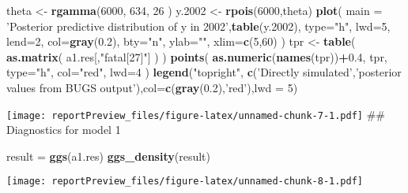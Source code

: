\documentclass[]{article}
\newenvironment{Shaded}{\begin{snugshade}}{\end{snugshade}}
\newcommand{\KeywordTok}[1]{\textcolor[rgb]{0.13,0.29,0.53}{\textbf{#1}}}
\newcommand{\DataTypeTok}[1]{\textcolor[rgb]{0.13,0.29,0.53}{#1}}
\newcommand{\DecValTok}[1]{\textcolor[rgb]{0.00,0.00,0.81}{#1}}
\newcommand{\FloatTok}[1]{\textcolor[rgb]{0.00,0.00,0.81}{#1}}
\newcommand{\StringTok}[1]{\textcolor[rgb]{0.31,0.60,0.02}{#1}}
\newcommand{\OperatorTok}[1]{\textcolor[rgb]{0.81,0.36,0.00}{\textbf{#1}}}
\newcommand{\NormalTok}[1]{#1}
\begin{document}
\begin{Shaded}
\begin{Highlighting}[]
\NormalTok{theta <-}\StringTok{ }\KeywordTok{rgamma}\NormalTok{(}\DecValTok{6000}\NormalTok{, }\DecValTok{634}\NormalTok{, }\DecValTok{26}\NormalTok{ )}
\NormalTok{y.}\DecValTok{2002}\NormalTok{ <-}\StringTok{ }\KeywordTok{rpois}\NormalTok{(}\DecValTok{6000}\NormalTok{,theta)}
\KeywordTok{plot}\NormalTok{( }\DataTypeTok{main =} \StringTok{'Posterior predictive distribution of y in 2002'}\NormalTok{,}\KeywordTok{table}\NormalTok{(y.}\DecValTok{2002}\NormalTok{), }\DataTypeTok{type=}\StringTok{"h"}\NormalTok{, }\DataTypeTok{lwd=}\DecValTok{5}\NormalTok{, }\DataTypeTok{lend=}\DecValTok{2}\NormalTok{, }\DataTypeTok{col=}\KeywordTok{gray}\NormalTok{(}\FloatTok{0.2}\NormalTok{), }\DataTypeTok{bty=}\StringTok{"n"}\NormalTok{, }\DataTypeTok{ylab=}\StringTok{""}\NormalTok{, }\DataTypeTok{xlim=}\KeywordTok{c}\NormalTok{(}\DecValTok{5}\NormalTok{,}\DecValTok{60}\NormalTok{) )}
\NormalTok{tpr <-}\StringTok{ }\KeywordTok{table}\NormalTok{( }\KeywordTok{as.matrix}\NormalTok{( a1.res[,}\StringTok{"fatal[27]"}\NormalTok{] ) )}
\KeywordTok{points}\NormalTok{( }\KeywordTok{as.numeric}\NormalTok{(}\KeywordTok{names}\NormalTok{(tpr))}\OperatorTok{+}\FloatTok{0.4}\NormalTok{, tpr, }\DataTypeTok{type=}\StringTok{"h"}\NormalTok{, }\DataTypeTok{col=}\StringTok{"red"}\NormalTok{, }\DataTypeTok{lwd=}\DecValTok{4}\NormalTok{ )}
\KeywordTok{legend}\NormalTok{(}\StringTok{"topright"}\NormalTok{, }\KeywordTok{c}\NormalTok{(}\StringTok{'Directly simulated'}\NormalTok{,}\StringTok{'posterior values from BUGS output'}\NormalTok{),}\DataTypeTok{col=}\KeywordTok{c}\NormalTok{(}\KeywordTok{gray}\NormalTok{(}\FloatTok{0.2}\NormalTok{),}\StringTok{'red'}\NormalTok{),}\DataTypeTok{lwd =} \DecValTok{5}\NormalTok{)}
\end{Highlighting}
\end{Shaded}

\texttt{[image: reportPreview\_files/figure-latex/unnamed-chunk-7-1.pdf]}
\#\# Diagnostics for model 1

\begin{Shaded}
\begin{Highlighting}[]
\NormalTok{result =}\StringTok{ }\KeywordTok{ggs}\NormalTok{(a1.res)}
\KeywordTok{ggs_density}\NormalTok{(result)}
\end{Highlighting}
\end{Shaded}

\texttt{[image: reportPreview\_files/figure-latex/unnamed-chunk-8-1.pdf]}
\end{document}

